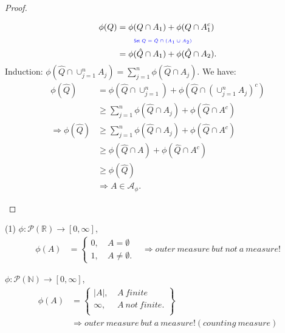 \documentclass[../../note.tex]{subfiles}
\begin{document}
\begin{proof}
\begin{itemize}
        \begin{align}
            \phi(Q)
            &= \phi(Q \cap A_1) + \phi(Q \cap A_1^c) \\
            &\qquad\text{\color{blue}{\tiny\sffamily Set $Q = \hat{Q}\cap (A_1 \cup A_2)$}} \nonumber \\
            &= \phi(\hat{Q}\cap A_1) + \phi(\hat{Q}\cap A_2).
        \end{align}
        Induction: $\phi(\hat{Q}\cap \cup_{j=1}^{n} A_j) = \sum_{j=1}^{n} \phi(\hat{Q} \cap A_j)$.
        We have:
        \begin{align}
            \phi(\hat{Q})
            &= \phi(\hat{Q}\cap \cup_{j=1}^{n}) + \phi(\hat{Q} \cap (\cup_{j=1}^n A_j)^c) \\
            &\geq \sum_{j=1}^n \phi(\hat{Q}\cap A_j) + \phi(\hat{Q}\cap A^c) \\
            \Longrightarrow \phi(\hat{Q}) 
            &\geq \sum_{j=1}^n \phi(\hat{Q}\cap A_j) + \phi(\hat{Q}\cap A^c) \\
            &\geq \phi(\hat{Q} \cap A) + \phi(\hat{Q} \cap A^c) \\
            &\geq \phi(\hat{Q}) \\
            &\Longrightarrow A \in \mathcal{A}_{\phi}.
        \end{align}
    \end{itemize}
\end{proof}

\begin{example}
    (1) $\phi:\mathcal{P}(\mathbb{R}) \rightarrow [0,\infty]$,
    \begin{align}
        \phi(A)
        &= \left\{
            \begin{matrix}
                0,&~A = \emptyset \\
                1,&~A \neq \emptyset.
            \end{matrix}
        \right.
        &\Longrightarrow outer~measure~but~not~a~measure!
    \end{align}
\end{example}

\begin{example}
    $\phi: \mathcal{P}(\mathbb{N}) \rightarrow [0,\infty]$, 
    \begin{align}
        \phi(A)
        &= \left\{
            \begin{matrix}
                \vert A \vert,&~A~finite \\
                \infty,&~A~not~finite.\\
            \end{matrix}
        \right\}\\
        &\Longrightarrow outer~measure~but~a~measure!(counting~measure)
    \end{align}
\end{example}
\end{document}
